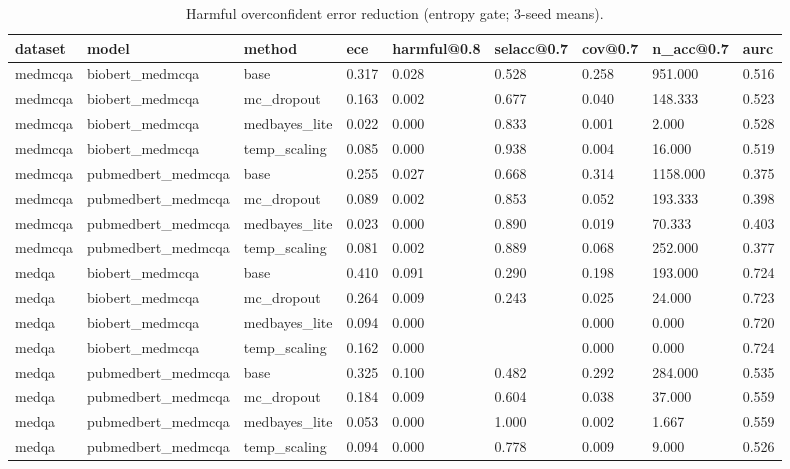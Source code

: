 \begin{table}[htbp]
\centering
\caption{Harmful overconfident error reduction (entropy gate; 3-seed means).}
\label{tab:rev_table8_entropy_gate}
\begin{tabular}{lllllllll}
\toprule
dataset & model & method & ece & harmful@0.8 & selacc@0.7 & cov@0.7 & n\_acc@0.7 & aurc \\
\midrule
medmcqa & biobert\_medmcqa & base & 0.317 & 0.028 & 0.528 & 0.258 & 951.000 & 0.516 \\
medmcqa & biobert\_medmcqa & mc\_dropout & 0.163 & 0.002 & 0.677 & 0.040 & 148.333 & 0.523 \\
medmcqa & biobert\_medmcqa & medbayes\_lite & 0.022 & 0.000 & 0.833 & 0.001 & 2.000 & 0.528 \\
medmcqa & biobert\_medmcqa & temp\_scaling & 0.085 & 0.000 & 0.938 & 0.004 & 16.000 & 0.519 \\
medmcqa & pubmedbert\_medmcqa & base & 0.255 & 0.027 & 0.668 & 0.314 & 1158.000 & 0.375 \\
medmcqa & pubmedbert\_medmcqa & mc\_dropout & 0.089 & 0.002 & 0.853 & 0.052 & 193.333 & 0.398 \\
medmcqa & pubmedbert\_medmcqa & medbayes\_lite & 0.023 & 0.000 & 0.890 & 0.019 & 70.333 & 0.403 \\
medmcqa & pubmedbert\_medmcqa & temp\_scaling & 0.081 & 0.002 & 0.889 & 0.068 & 252.000 & 0.377 \\
medqa & biobert\_medmcqa & base & 0.410 & 0.091 & 0.290 & 0.198 & 193.000 & 0.724 \\
medqa & biobert\_medmcqa & mc\_dropout & 0.264 & 0.009 & 0.243 & 0.025 & 24.000 & 0.723 \\
medqa & biobert\_medmcqa & medbayes\_lite & 0.094 & 0.000 &  & 0.000 & 0.000 & 0.720 \\
medqa & biobert\_medmcqa & temp\_scaling & 0.162 & 0.000 &  & 0.000 & 0.000 & 0.724 \\
medqa & pubmedbert\_medmcqa & base & 0.325 & 0.100 & 0.482 & 0.292 & 284.000 & 0.535 \\
medqa & pubmedbert\_medmcqa & mc\_dropout & 0.184 & 0.009 & 0.604 & 0.038 & 37.000 & 0.559 \\
medqa & pubmedbert\_medmcqa & medbayes\_lite & 0.053 & 0.000 & 1.000 & 0.002 & 1.667 & 0.559 \\
medqa & pubmedbert\_medmcqa & temp\_scaling & 0.094 & 0.000 & 0.778 & 0.009 & 9.000 & 0.526 \\
\bottomrule
\end{tabular}
\end{table}
